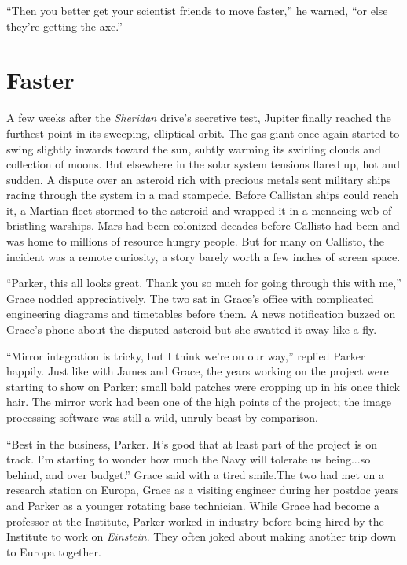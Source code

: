 \documentclass[openany, 12pt]{book} %
\begin{document}
``Then you better get your scientist friends to move faster,'' he warned, ``or else they're getting the axe.''

\chapter{Faster}

A few weeks after the \textit{Sheridan} drive's secretive test, Jupiter finally reached the furthest point in its sweeping, elliptical orbit. The gas giant once again started to swing slightly inwards toward the sun, subtly warming its swirling clouds and collection of moons. But elsewhere in the solar system tensions flared up, hot and sudden. A dispute over an asteroid rich with precious metals sent military ships racing through the system in a mad stampede. Before Callistan ships could reach it, a Martian fleet stormed to the asteroid and wrapped it in a menacing web of bristling warships. Mars had been colonized decades before Callisto had been and was home to millions of resource hungry people. But for many on Callisto, the incident was a remote curiosity, a story barely worth a few inches of screen space.

``Parker, this all looks great. Thank you so much for going through this with me,'' Grace nodded appreciatively. The two sat in Grace's office with complicated engineering diagrams and timetables before them. A news notification buzzed on Grace's phone about the disputed asteroid but she swatted it away like a fly. 

``Mirror integration is tricky, but I think we're on our way,'' replied Parker happily. Just like with James and Grace, the years working on the project were starting to show on Parker; small bald patches were cropping up in his once thick hair. The mirror work had been one of the high points of the project; the image processing software was still a wild, unruly beast by comparison.

``Best in the business, Parker. It's good that at least part of the project is on track. I'm starting to wonder how much the Navy will tolerate us being...so behind, and over budget.'' Grace said with a tired smile.The two had met on a research station on Europa, Grace as a visiting engineer during her postdoc years and Parker as a younger rotating base technician. While Grace had become a professor at the Institute, Parker worked in industry before being hired by the Institute to work on \textit{Einstein}. They often joked about making another trip down to Europa together. 
\end{document}
